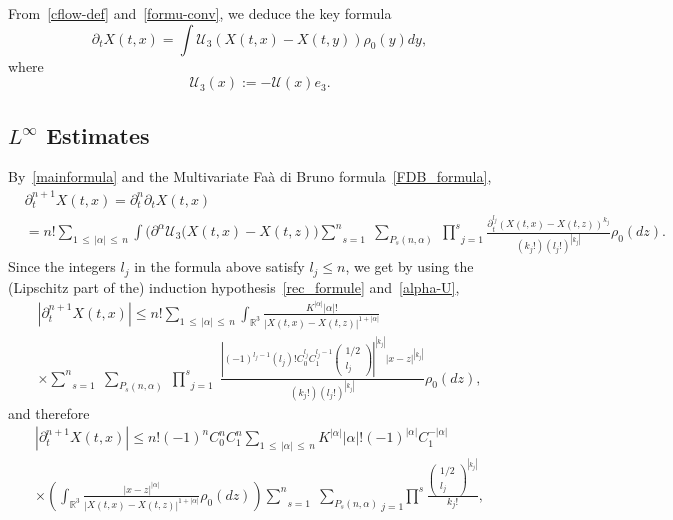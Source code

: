 \documentclass[AHL,Unicode,longabstracts,published]{cedram}
\newcommand{\R}{\mathbb{R}}
\newcommand{\clU}{\mathcal{U}}
\renewcommand{\leq}{\leqslant}
\begin{document}
From~\eqref{cflow-def} and~\eqref{formu-conv}, we deduce the key formula
\begin{equation}\label{mainformula}
\partial_t X(t,x)=\int \clU_3(X(t,x)-X(t,y)) \rho_0(y) dy,
\end{equation}
where
\[
\clU_3(x):=- \clU(x)e_3.
\]


\subsection{\texorpdfstring{$L^\infty$}{L infty} Estimates}

By~\eqref{mainformula} and the Multivariate Faà di Bruno formula~\eqref{FDB_formula},
\begin{align*}
&\partial_t^{n+1} X(t,x)= \partial_t^n \partial_t X(t,x)\\
&=n! \underset{1\,\leq\,|\alpha|\,\leq\,n}{\sum} \int \big(\partial^\alpha \clU_3(X(t,x)-X(t,z)\big)\underset{s=1}{\overset{n}{\sum}}\;\underset{P_s(n,\alpha)}{\sum}\;\underset{j=1}{\overset{s}{\prod}}\frac{\partial_t^{l_j} (X(t,x)-X(t,z))^{k_j}}{\left(k_j!\right) \left(l_j!\right)^{|k_j|}}\rho_0(dz).
\end{align*}
Since the integers $l_j$ in the formula above satisfy $l_j\leq n$, we get by using the (Lipschitz part of the) induction hypothesis~\eqref{rec_formule} and~\eqref{alpha-U},
\begin{multline*}
\left|\partial_t^{n+1} X(t,x)\right| \leq n! \underset{1\,\leq\,|\alpha|\,\leq\,n}{\sum} \int_{\R^3} \frac{K^{|\alpha|}|\alpha|!}{|X(t,x)-X(t,z)|^{1+|\alpha|}}\\
\times \underset{s=1}{\overset{n}{\sum}}\;\underset{P_s(n,\alpha)}{\sum}\;\underset{j=1}{\overset{s}{\prod}}\;\frac{\left| (-1)^{l_j-1}\left(l_j\right)!C_0^{l_j}C_1^{l_j-1}
\begin{pmatrix}
1/2\\ l_j
\end{pmatrix}\right|^{|k_j|} |x-z|^{|k_j|}}{\left(k_j!\right) \left(l_j!\right)^{|k_j|}}\rho_0(dz),
\end{multline*}
and therefore
\begin{multline*}
\left|\partial_t^{n+1} X(t,x)\right|
\leq n!(-1)^n C_0^n C_1^n \underset{1\,\leq\,|\alpha|\,\leq\,n}{\sum} K^{|\alpha|}|\alpha|!(-1)^{|\alpha|}C_1^{-|\alpha|}\\
\times \left(\int_{\R^3}
\frac{|x-z|^{|\alpha|}}{|X(t,x)-X(t,z)|^{1+|\alpha|}}\rho_0(dz)\right) \underset{s=1}{\overset{n}{\sum}}\;\underset{P_s(n,\alpha)}{\sum}\underset{j=1}\;{\overset{s}{\prod}} \frac{
\begin{pmatrix}1/2\\ l_j
\end{pmatrix}^{|k_j|}}{k_j!},
\end{multline*}
\end{document}
